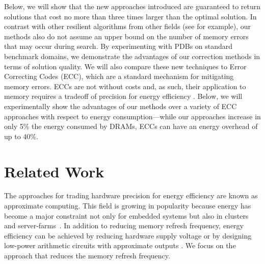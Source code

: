 \documentclass[letterpaper]{article}
\begin{document}
Below, we will show that the new approaches introduced are guaranteed to return solutions that cost no more than three times larger than the optimal solution. In contrast with other resilient algorithms from other fields (see \cite{finocchi2007designing} for example), our methods also do not assume an upper bound on the number of memory errors that may occur during search. By experimenting with PDBs on standard benchmark domains, we demonstrate the advantages of our correction methods in terms of solution quality. We will also compare these new techniques to Error Correcting Codes (ECC), which are a standard mechanism for mitigating memory errors. ECCs are not without costs and, as such, their application to memory requires a tradeoff of precision for energy efficiency \cite{Luo:2014:CAM:2671853.2672438}. Below, we will experimentally show the advantages of our methods over a variety of ECC approaches with respect to energy consumption---while our approaches increase in only 5\% the energy consumed by DRAMs, ECCs can have an energy overhead of up to 40\%. 


\section{Related Work}


The approaches for trading hardware precision for energy efficiency are known as approximate computing. This field is growing in popularity because energy has become a major constraint not only for embedded systems but also in clusters and server-farms~\cite{Cameron2005}. 
%
In addition to reducing memory refresh frequency, energy efficiency can be achieved 
%
by reducing hardware supply voltage \cite{974895} or by designing low-power arithmetic circuits with approximate outputs \cite{5993675}. We focus on the approach that reduces the memory refresh frequency.  %
\end{document}
